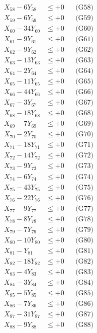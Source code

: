\documentclass[a4paper,10pt]{article}
\begin{document}
{\begin{align}
X_{58} - 6Y_{58} &\leq +0 && \text{(G58)} \\
X_{59} - 6Y_{59} &\leq +0 && \text{(G59)} \\
X_{60} - 34Y_{60} &\leq +0 && \text{(G60)} \\
X_{61} - 9Y_{61} &\leq +0 && \text{(G61)} \\
X_{62} - 9Y_{62} &\leq +0 && \text{(G62)} \\
X_{63} - 13Y_{63} &\leq +0 && \text{(G63)} \\
\allowbreak
X_{64} - 2Y_{64} &\leq +0 && \text{(G64)} \\
X_{65} - 11Y_{65} &\leq +0 && \text{(G65)} \\
X_{66} - 44Y_{66} &\leq +0 && \text{(G66)} \\
X_{67} - 3Y_{67} &\leq +0 && \text{(G67)} \\
X_{68} - 18Y_{68} &\leq +0 && \text{(G68)} \\
X_{69} - 7Y_{69} &\leq +0 && \text{(G69)} \\
X_{70} - 2Y_{70} &\leq +0 && \text{(G70)} \\
X_{71} - 18Y_{71} &\leq +0 && \text{(G71)} \\
X_{72} - 14Y_{72} &\leq +0 && \text{(G72)} \\
X_{73} - 9Y_{73} &\leq +0 && \text{(G73)} \\
\allowbreak
X_{74} - 6Y_{74} &\leq +0 && \text{(G74)} \\
X_{75} - 43Y_{75} &\leq +0 && \text{(G75)} \\
X_{76} - 22Y_{76} &\leq +0 && \text{(G76)} \\
X_{77} - 9Y_{77} &\leq +0 && \text{(G77)} \\
X_{78} - 8Y_{78} &\leq +0 && \text{(G78)} \\
X_{79} - 7Y_{79} &\leq +0 && \text{(G79)} \\
X_{80} - 10Y_{80} &\leq +0 && \text{(G80)} \\
X_{81} - Y_{81} &\leq +0 && \text{(G81)} \\
X_{82} - 18Y_{82} &\leq +0 && \text{(G82)} \\
X_{83} - 4Y_{83} &\leq +0 && \text{(G83)} \\
\allowbreak
X_{84} - 3Y_{84} &\leq +0 && \text{(G84)} \\
X_{85} - 5Y_{85} &\leq +0 && \text{(G85)} \\
X_{86} - 7Y_{86} &\leq +0 && \text{(G86)} \\
X_{87} - 31Y_{87} &\leq +0 && \text{(G87)} \\
X_{88} - 9Y_{88} &\leq +0 && \text{(G88)} \\

\end{align}}
\end{document}
